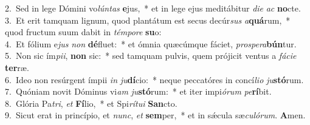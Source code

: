 {2.~}Sed in lege Dómini vo\textit{lún}\textit{tas} \textbf{e}jus,~* et in lege ejus meditábitur \textit{di}\textit{e} \textit{ac} \textbf{no}cte.\\
{3.~}Et erit tamquam lignum, quod plantátum est secus decúr\textit{sus} \textit{a}\textbf{quá}rum,~* quod fructum suum dabit in \textit{tém}\textit{po}\textit{re} \textbf{su}o:\\
{4.~}Et fólium e\textit{jus} \textit{non} \textbf{dé}fluet:~* et ómnia quæcúmque fáciet, \textit{pro}\textit{spe}\textit{ra}\textbf{bún}tur.\\
{5.~}Non sic ím\textit{pi}\textit{i}, \textbf{non} sic:~* sed tamquam pulvis, quem prójicit ventus a \textit{fá}\textit{ci}\textit{e} \textbf{ter}ræ.\\
{6.~}Ideo non resúrgent ímpii \textit{in} \textit{ju}\textbf{dí}cio:~* neque peccatóres in concí\textit{li}\textit{o} \textit{ju}\textbf{stó}rum.\\
{7.~}Quóniam novit Dóminus vi\textit{am} \textit{ju}\textbf{stó}rum:~* et iter impi\textit{ó}\textit{rum} \textit{pe}\textbf{rí}bit.\\
{8.~}Glória Pa\textit{tri}, \textit{et} \textbf{Fí}lio,~* et Spi\textit{rí}\textit{tu}\textit{i} \textbf{San}cto.\\
{9.~}Sicut erat in princípio, et \textit{nunc}, \textit{et} \textbf{sem}per,~* et in sǽcula sæ\textit{cu}\textit{ló}\textit{rum}. \textbf{A}men.\\
